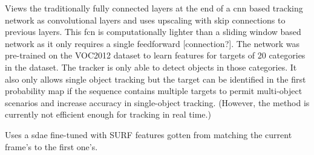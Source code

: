 {\cite{FCN_TRACK}
Views the traditionally fully connected layers at the end of a \ac{cnn} based
tracking network as convolutional layers and uses upscaling with skip connections
to previous layers. This \ac{fcn} is computationally lighter than a sliding window
based network as it only requires a single feedforward [connection?]. The network
was pre-trained on the VOC2012 dataset to learn features for targets of 20 categories
in the dataset. The tracker is only able to detect objects in those categories.
It also only allows single object tracking but the target can be identified in the
first probability map if the sequence contains multiple targets to permit multi-object
scenarios and increase accuracy in single-object tracking. (However, the method is
currently not efficient enough for tracking in real time.)

\cite{SMS_DLT}
Uses a \ac{sdae} fine-tuned with SURF features gotten from matching the current frame's
to the first one's.
}